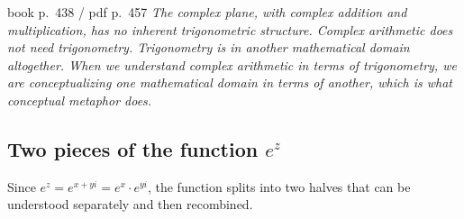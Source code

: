\begin{warmbox}[title={Do not let the familiarity hide the metaphor}]
\begin{bookquote}{book p.~438 / pdf p.~457}
\textit{The complex plane, with complex addition and multiplication, has no inherent trigonometric
structure. Complex arithmetic does not need trigonometry. Trigonometry is in another mathematical
domain altogether. When we understand complex arithmetic in terms of trigonometry, we are
conceptualizing one mathematical domain in terms of another, which is what conceptual metaphor does.}
\end{bookquote}
\end{warmbox}

\clearpage
\subsection{Two pieces of the function \texorpdfstring{$e^{z}$}{e\^{}z}}

Since $e^{z}=e^{x+yi}=e^{x}\cdot e^{yi}$, the function splits into two halves that can be understood
separately and then recombined.

